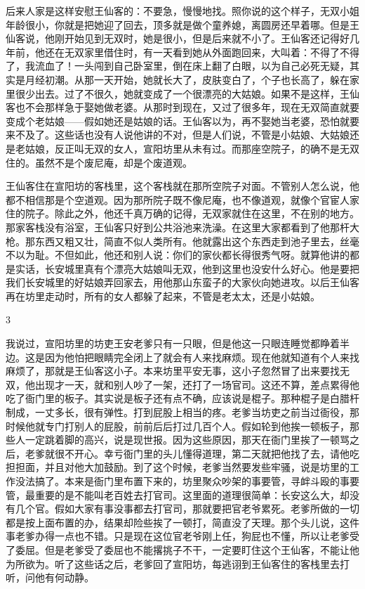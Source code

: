 后来人家是这样安慰王仙客的：不要急，慢慢地找。照你说的这个样子，无双小姐年龄很小，你就是把她迎了回去，顶多就是做个童养媳，离圆房还早着哪。但是王仙客说，他刚开始见到无双时，她是很小，但是后来就不小了。王仙客还记得好几年前，他还在无双家里借住时，有一天看到她从外面跑回来，大叫着：不得了不得了，我流血了！一头闯到自己卧室里，倒在床上翻了白眼，以为自己必死无疑，其实是月经初潮。从那一天开始，她就长大了，皮肤变白了，个子也长高了，躲在家里很少出去。过了不很久，她就变成了一个很漂亮的大姑娘。如果不是这样，王仙客也不会那样急于娶她做老婆。从那时到现在，又过了很多年，现在无双简直就要变成个老姑娘——假如她还是姑娘的话。王仙客以为，再不娶她当老婆，恐怕就要来不及了。这些话也没有人说他讲的不对，但是人们说，不管是小姑娘、大姑娘还是老姑娘，反正叫无双的女人，宣阳坊里从未有过。而那座空院子，的确不是无双住的。虽然不是个废尼庵，却是个废道观。 

王仙客住在宣阳坊的客栈里，这个客栈就在那所空院子对面。不管别人怎么说，他都不相信那是个空道观。因为那所院子既不像尼庵，也不像道观，就像个官宦人家住的院子。除此之外，他还千真万确的记得，无双家就住在这里，不在别的地方。那家客栈没有浴室，王仙客只好到公共浴池来洗澡。在这里大家都看到了他那杆大枪。那东西又粗又壮，简直不似人类所有。他就露出这个东西走到池子里去，丝毫不以为耻。不但如此，他还和别人说：你们的家伙都长得很秀气呀。就算他讲的都是实话，长安城里真有个漂亮大姑娘叫无双，他到这里也没安什么好心。他是要把我们长安城里的好姑娘弄回家去，用他那山东蛮子的大家伙向她进攻。以后王仙客再在坊里走动时，所有的女人都躲了起来，不管是老太太，还是小姑娘。 

3 

我说过，宣阳坊里的坊吏王安老爹只有一只眼，但是他这一只眼连睡觉都睁着半边。这是因为他怕把眼睛完全闭上了就会有人来找麻烦。现在他就知道有个人来找麻烦了，那就是王仙客这小子。本来坊里平安无事，这小子忽然冒了出来要找无双，他出现才一天，就和别人吵了一架，还打了一场官司。这还不算，差点累得他吃了衙门里的板子。其实说是板子还有点不确，应该说是棍子。那种棍子是白腊杆制成，一丈多长，很有弹性。打到屁股上相当的疼。老爹当坊吏之前当过衙役，那时候他就专门打别人的屁股，前前后后打过几百个人。假如轮到他挨一顿板子，那些人一定跳着脚的高兴，说是现世报。因为这些原因，那天在衙门里挨了一顿骂之后，老爹就很不开心。幸亏衙门里的头儿懂得道理，第二天就把他找了去，请他吃担担面，并且对他大加鼓励。到了这个时候，老爹当然要发些牢骚，说是坊里的工作没法搞了。本来是衙门里布置下来的，坊里聚众吵架的事要管，寻衅斗殴的事要管，最重要的是不能叫老百姓去打官司。这里面的道理很简单：长安这么大，却没有几个官。假如大家有事没事都去打官司，那就要把官老爷累死。老爹所做的一切都是按上面布置的办，结果却险些挨了一顿打，简直没了天理。那个头儿说，这件事老爹办得一点也不错。只是现在这位官老爷刚上任，狗屁也不懂，所以让老爹受了委屈。但是老爹受了委屈也不能撂挑子不干，一定要盯住这个王仙客，不能让他为所欲为。听了这些话之后，老爹回了宣阳坊，每逃诩到王仙客住的客栈里去打听，问他有何动静。 

